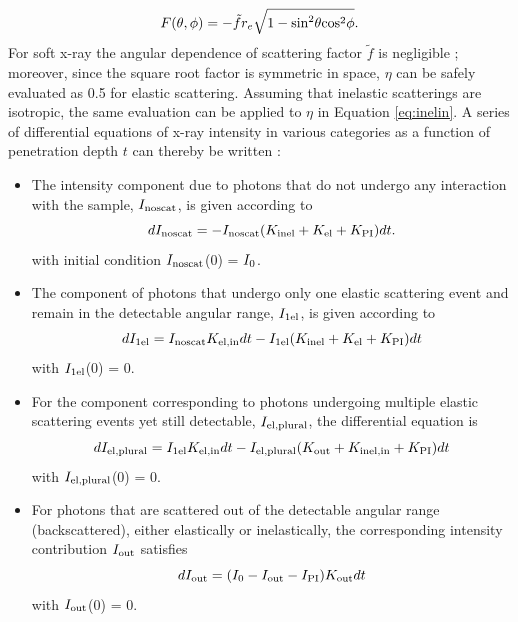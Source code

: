 \documentclass[]{article}
\newcommand\nt{\textup{\scriptsize{0}}}
\newcommand\el{\textup{\scriptsize{el}}}
\newcommand\inel{\textup{\scriptsize{inel}}}
\newcommand\elin{\textup{\scriptsize{el,in}}}
\newcommand\inelin{\textup{\scriptsize{inel,in}}}
\newcommand\out{\textup{\scriptsize{out}}}
\newcommand\PI{\textup{\scriptsize{PI}}}
\newcommand\noscat{\textup{\scriptsize{noscat}}}
\newcommand\sel{\textup{\scriptsize{1el}}}
\newcommand\elpl{\textup{\scriptsize{el,plural}}}
\begin{document}
\begin{equation}
F(\theta, \phi) = -\tilde{f}r_e\sqrt{1-\textup{sin}^2\theta \textup{cos}^2\phi}.
\end{equation}
For soft x-ray the angular dependence of scattering factor $\tilde{f}$ is negligible \cite{Lonsdale:1962gz}; moreover, since the square root factor is symmetric in space, $\eta$ can be safely evaluated as 0.5 for elastic scattering. Assuming that inelastic scatterings are isotropic, the same evaluation can be applied to $\eta$ in Equation \ref{eq:inelin}. A series of differential equations of x-ray intensity in various categories as a function of penetration depth $t$ can thereby be written \cite{Jacobsen:1998vj}:

\begin{itemize}

\item The intensity component due to photons that do not undergo any interaction with the sample, $I_{\noscat}$, is given according to
\begin{equation}
dI_{\noscat} = -I_{\noscat}(K_{\inel}+K_{\el}+K_{\PI}) dt.
\end{equation}
with initial condition $I_{\noscat}$(0) = $I_{\nt}$.

\item The component of photons that undergo only one elastic scattering event and remain in the detectable angular range, $I_{\sel}$, is given according to
\begin{equation}
dI_{\sel} = I_{\noscat}K_{\elin} dt - I_{\sel}(K_{\inel}+K_{\el}+K_{\PI}) dt
\end{equation}
with $I_{\sel}$(0) = 0.

\item For the component corresponding to photons undergoing multiple elastic scattering events yet still detectable, $I_{\elpl}$, the differential equation is
\begin{equation}
dI_{\elpl} = I_{\sel}K_{\elin} dt - I_{\elpl}(K_{\out}+K_{\inelin}+K_{\PI}) dt
\end{equation}
with $I_{\elpl}$(0) = 0.

\item For photons that are scattered out of the detectable angular range (backscattered), either elastically or inelastically, the corresponding intensity contribution $I_{\out}$ satisfies
\begin{equation}
dI_{\out} = (I_{\nt} - I_{\out} - I_{\PI})K_{\out} dt
\end{equation}
with $I_{\out}$(0) = 0.


\end{itemize}
\end{document}
